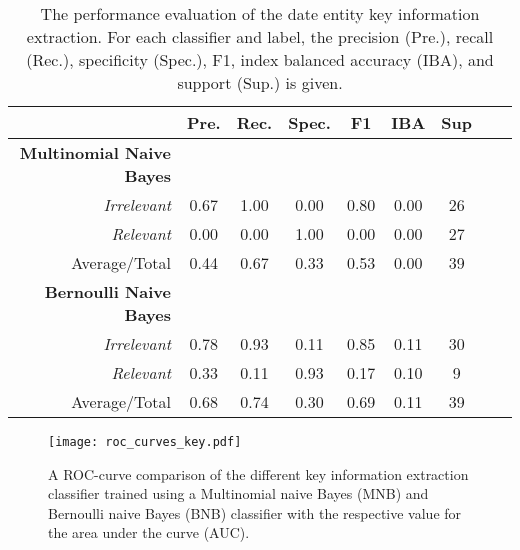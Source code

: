 \begin{table}
  \caption{The performance evaluation of the date entity key information extraction. For each classifier and label, the precision (Pre.), recall (Rec.), specificity (Spec.), F1, index balanced accuracy (IBA), and support (Sup.) is given.}
  \centering
  \begin{tabular}{@{}rcccccccc@{}}
    \toprule
     & \textbf{Pre.} & \textbf{Rec.} & \textbf{Spec.}
    & \textbf{F1} &  \textbf{IBA}& \textbf{Sup} \\
    \midrule
    \textbf{Multinomial Naive Bayes}\\
    \emph{Irrelevant}& 0.67& 1.00&  0.00& 0.80& 0.00& 26 \\
    \emph{Relevant}& 0.00& 0.00&  1.00& 0.00& 0.00& 27 \\
    Average/Total& 0.44& 0.67& 0.33& 0.53& 0.00& 39 \vspace{2mm}\\
    \textbf{Bernoulli Naive Bayes}\\
    \emph{Irrelevant}& 0.78& 0.93&  0.11& 0.85& 0.11& 30 \\
    \emph{Relevant}& 0.33& 0.11&  0.93& 0.17& 0.10& 9 \\
    Average/Total& 0.68& 0.74& 0.30& 0.69& 0.11& 39 \vspace{2mm}\\
    \bottomrule
  \end{tabular}
\label{table:keyword_performance_dates}
\end{table}

\begin{figure}
  \centering
  \texttt{[image: roc\_curves\_key.pdf]}
  \caption{A ROC-curve comparison of the different key information extraction classifier trained using a Multinomial naive Bayes (MNB) and Bernoulli naive Bayes (BNB) classifier with the respective value for the area under the curve (AUC).}
\label{fig:roc_key}
\end{figure}

